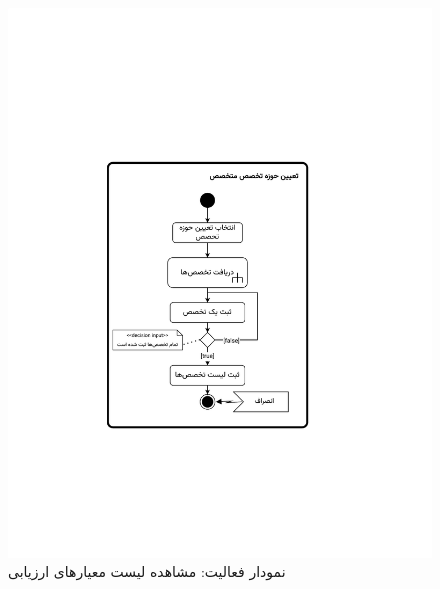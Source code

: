 \begin{figure}
	\centering
	\includegraphics[scale=0.8, page=8]{figs/OOD-activity21-30.pdf}
	\caption{نمودار فعالیت: مشاهده لیست معیارهای ارزیابی}
\end{figure}
\FloatBarrier
\newpage

